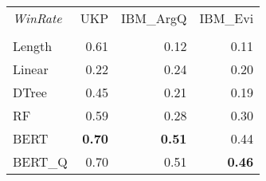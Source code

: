 \begin{tabular}{lrrr}
\toprule
\textit{WinRate} &   UKP &  IBM\_ArgQ &  IBM\_Evi \\
  &       &           &          \\
\midrule
Length &  0.61 &      0.12 &     0.11 \\
Linear &  0.22 &      0.24 &     0.20 \\
DTree  &  0.45 &      0.21 &     0.19 \\
RF     &  0.59 &      0.28 &     0.30 \\
BERT   &  \textbf{0.70} &      \textbf{0.51} &     0.44 \\
BERT\_Q &  0.70 &      0.51 &     \textbf{0.46} \\
\bottomrule
\end{tabular}
